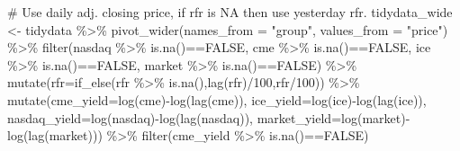 \documentclass[
  a4paper,
  DIV=11,
  numbers=noendperiod]{scrreprt}
\newenvironment{Shaded}{\begin{snugshade}}{\end{snugshade}}
\newcommand{\AttributeTok}[1]{\textcolor[rgb]{0.40,0.45,0.13}{#1}}
\newcommand{\CommentTok}[1]{\textcolor[rgb]{0.37,0.37,0.37}{#1}}
\newcommand{\ConstantTok}[1]{\textcolor[rgb]{0.56,0.35,0.01}{#1}}
\newcommand{\DecValTok}[1]{\textcolor[rgb]{0.68,0.00,0.00}{#1}}
\newcommand{\FunctionTok}[1]{\textcolor[rgb]{0.28,0.35,0.67}{#1}}
\newcommand{\NormalTok}[1]{\textcolor[rgb]{0.00,0.23,0.31}{#1}}
\newcommand{\OtherTok}[1]{\textcolor[rgb]{0.00,0.23,0.31}{#1}}
\newcommand{\SpecialCharTok}[1]{\textcolor[rgb]{0.37,0.37,0.37}{#1}}
\newcommand{\StringTok}[1]{\textcolor[rgb]{0.13,0.47,0.30}{#1}}
\begin{document}
\begin{Shaded}
\begin{Highlighting}[]
\CommentTok{\# Use daily adj. closing price, if rfr is NA then use yesterday rfr.}
\NormalTok{tidydata\_wide }\OtherTok{\textless{}{-}}\NormalTok{ tidydata }\SpecialCharTok{\%\textgreater{}\%} 
  \FunctionTok{pivot\_wider}\NormalTok{(}\AttributeTok{names\_from =} \StringTok{"group"}\NormalTok{, }\AttributeTok{values\_from =} \StringTok{"price"}\NormalTok{) }\SpecialCharTok{\%\textgreater{}\%} 
  \FunctionTok{filter}\NormalTok{(nasdaq }\SpecialCharTok{\%\textgreater{}\%} \FunctionTok{is.na}\NormalTok{()}\SpecialCharTok{==}\ConstantTok{FALSE}\NormalTok{,}
\NormalTok{         cme }\SpecialCharTok{\%\textgreater{}\%} \FunctionTok{is.na}\NormalTok{()}\SpecialCharTok{==}\ConstantTok{FALSE}\NormalTok{,}
\NormalTok{         ice }\SpecialCharTok{\%\textgreater{}\%} \FunctionTok{is.na}\NormalTok{()}\SpecialCharTok{==}\ConstantTok{FALSE}\NormalTok{,}
\NormalTok{         market }\SpecialCharTok{\%\textgreater{}\%} \FunctionTok{is.na}\NormalTok{()}\SpecialCharTok{==}\ConstantTok{FALSE}\NormalTok{) }\SpecialCharTok{\%\textgreater{}\%} 
  \FunctionTok{mutate}\NormalTok{(}\AttributeTok{rfr=}\FunctionTok{if\_else}\NormalTok{(rfr }\SpecialCharTok{\%\textgreater{}\%} \FunctionTok{is.na}\NormalTok{(),}\FunctionTok{lag}\NormalTok{(rfr)}\SpecialCharTok{/}\DecValTok{100}\NormalTok{,rfr}\SpecialCharTok{/}\DecValTok{100}\NormalTok{)) }\SpecialCharTok{\%\textgreater{}\%} 
  \FunctionTok{mutate}\NormalTok{(}\AttributeTok{cme\_yield=}\FunctionTok{log}\NormalTok{(cme)}\SpecialCharTok{{-}}\FunctionTok{log}\NormalTok{(}\FunctionTok{lag}\NormalTok{(cme)),}
         \AttributeTok{ice\_yield=}\FunctionTok{log}\NormalTok{(ice)}\SpecialCharTok{{-}}\FunctionTok{log}\NormalTok{(}\FunctionTok{lag}\NormalTok{(ice)),}
         \AttributeTok{nasdaq\_yield=}\FunctionTok{log}\NormalTok{(nasdaq)}\SpecialCharTok{{-}}\FunctionTok{log}\NormalTok{(}\FunctionTok{lag}\NormalTok{(nasdaq)),}
         \AttributeTok{market\_yield=}\FunctionTok{log}\NormalTok{(market)}\SpecialCharTok{{-}}\FunctionTok{log}\NormalTok{(}\FunctionTok{lag}\NormalTok{(market))) }\SpecialCharTok{\%\textgreater{}\%} 
  \FunctionTok{filter}\NormalTok{(cme\_yield }\SpecialCharTok{\%\textgreater{}\%} \FunctionTok{is.na}\NormalTok{()}\SpecialCharTok{==}\ConstantTok{FALSE}\NormalTok{)}
\end{Highlighting}
\end{Shaded}
\end{document}
